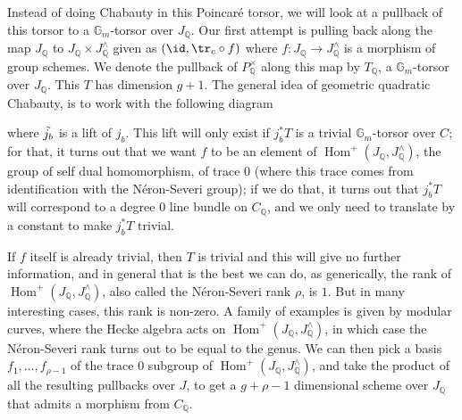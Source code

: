 \documentclass[12pt]{article}
\renewcommand{\G}{\mathbb{G}}
\newcommand{\Q}{\mathbb{Q}}
\DeclareMathOperator{\Hom}{Hom}
\theoremstyle{plain}
\theoremstyle{definition}
\theoremstyle{remark}
\begin{document}
{Instead of doing Chabauty in this Poincar\'e torsor, we will look at a pullback of this torsor to a $\G_m$-torsor over $J_\Q$. Our first attempt is pulling back along the map $J_\Q$ to $J_\Q \times J^\wedge_\Q$ given as $(\id,\tr_c \circ f)$ where $f: J_\Q \to J^\wedge_\Q$ is a morphism of group schemes. We denote the pullback of $P^\times_\Q$ along this map by $T_\Q$, a $\G_m$-torsor over $J_\Q$. This $T$ has dimension $g+1$. The general idea of geometric quadratic Chabauty, is to work with the following diagram
where $\Tilde{j_b}$ is a lift of $j_b$. This lift will only exist if $j_b^* T$ is a trivial $\G_m$-torsor over $C$; for that, it turns out that we want $f$ to be an element of $\Hom^+(J_\Q,J^\wedge_\Q)$, the group of self dual homomorphism, of trace 0 (where this trace comes from identification with the N\'eron-Severi group); if we do that, it turns out that $j_b^* T$ will correspond to a degree $0$ line bundle on $C_\Q$, and we only need to translate by a constant to make $j_b^* T$ trivial.

If $f$ itself is already trivial, then $T$ is trivial and this will give no further information, and in general that is the best we can do, as generically, the rank of $\Hom^+(J_\Q,J^\wedge_\Q)$, also called the N\'eron-Severi rank $\rho$, is $1$. But in many interesting cases, this rank is non-zero. A family of examples is given by modular curves, where the Hecke algebra acts on $\Hom^+(J_\Q,J^\wedge_\Q)$, in which case the N\'eron-Severi rank turns out to be equal to the genus. We can then pick a basis $f_1,\dots,f_{\rho-1}$ of the trace $0$ subgroup of $\Hom^+(J_\Q,J^\wedge_\Q)$, and take the product of all the resulting pullbacks over $J$, to get a $g+\rho-1$ dimensional scheme over $J_\Q$ that admits a morphism from $C_\Q$.

}
\end{document}
